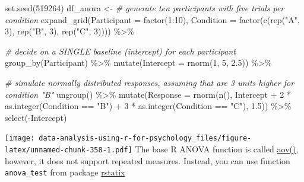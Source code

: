 \documentclass[
]{book}
\newenvironment{Shaded}{\begin{snugshade}}{\end{snugshade}}
\newcommand{\AttributeTok}[1]{\textcolor[rgb]{0.77,0.63,0.00}{#1}}
\newcommand{\CommentTok}[1]{\textcolor[rgb]{0.56,0.35,0.01}{\textit{#1}}}
\newcommand{\DecValTok}[1]{\textcolor[rgb]{0.00,0.00,0.81}{#1}}
\newcommand{\FloatTok}[1]{\textcolor[rgb]{0.00,0.00,0.81}{#1}}
\newcommand{\FunctionTok}[1]{\textcolor[rgb]{0.00,0.00,0.00}{#1}}
\newcommand{\NormalTok}[1]{#1}
\newcommand{\OtherTok}[1]{\textcolor[rgb]{0.56,0.35,0.01}{#1}}
\newcommand{\SpecialCharTok}[1]{\textcolor[rgb]{0.00,0.00,0.00}{#1}}
\newcommand{\StringTok}[1]{\textcolor[rgb]{0.31,0.60,0.02}{#1}}
\begin{document}
\begin{Shaded}
\begin{Highlighting}[]
\FunctionTok{set.seed}\NormalTok{(}\DecValTok{519264}\NormalTok{)}
\NormalTok{df\_anova }\OtherTok{\textless{}{-}}
  \CommentTok{\# generate ten participants with five trials per condition}
  \FunctionTok{expand\_grid}\NormalTok{(}\AttributeTok{Participant  =} \FunctionTok{factor}\NormalTok{(}\DecValTok{1}\SpecialCharTok{:}\DecValTok{10}\NormalTok{),}
              \AttributeTok{Condition =} \FunctionTok{factor}\NormalTok{(}\FunctionTok{c}\NormalTok{(}\FunctionTok{rep}\NormalTok{(}\StringTok{"A"}\NormalTok{, }\DecValTok{3}\NormalTok{), }\FunctionTok{rep}\NormalTok{(}\StringTok{"B"}\NormalTok{, }\DecValTok{3}\NormalTok{), }\FunctionTok{rep}\NormalTok{(}\StringTok{"C"}\NormalTok{, }\DecValTok{3}\NormalTok{)))) }\SpecialCharTok{\%\textgreater{}\%}
  
  \CommentTok{\# decide on a SINGLE baseline (intercept) for each participant}
  \FunctionTok{group\_by}\NormalTok{(Participant) }\SpecialCharTok{\%\textgreater{}\%}
  \FunctionTok{mutate}\NormalTok{(}\AttributeTok{Intercept =} \FunctionTok{rnorm}\NormalTok{(}\DecValTok{1}\NormalTok{, }\DecValTok{5}\NormalTok{, }\FloatTok{2.5}\NormalTok{)) }\SpecialCharTok{\%\textgreater{}\%}
  
  \CommentTok{\# simulate normally distributed responses, assuming that are 3 units higher for condition "B"}
  \FunctionTok{ungroup}\NormalTok{() }\SpecialCharTok{\%\textgreater{}\%}
  \FunctionTok{mutate}\NormalTok{(}\AttributeTok{Response =} \FunctionTok{rnorm}\NormalTok{(}\FunctionTok{n}\NormalTok{(), Intercept }\SpecialCharTok{+} \DecValTok{2} \SpecialCharTok{*} \FunctionTok{as.integer}\NormalTok{(Condition }\SpecialCharTok{==} \StringTok{"B"}\NormalTok{) }\SpecialCharTok{+} \DecValTok{3} \SpecialCharTok{*} \FunctionTok{as.integer}\NormalTok{(Condition }\SpecialCharTok{==} \StringTok{"C"}\NormalTok{), }\FloatTok{1.5}\NormalTok{)) }\SpecialCharTok{\%\textgreater{}\%}
  \FunctionTok{select}\NormalTok{(}\SpecialCharTok{{-}}\NormalTok{Intercept)}
\end{Highlighting}
\end{Shaded}

\texttt{[image: data-analysis-using-r-for-psychology\_files/figure-latex/unnamed-chunk-358-1.pdf]}
The base R ANOVA function is called \href{https://stat.ethz.ch/R-manual/R-devel/library/stats/html/aov.html}{aov()}, however, it does not support repeated measures. Instead, you can use function \texttt{anova\_test} from package \href{https://github.com/kassambara/rstatix}{rstatix}
\end{document}
